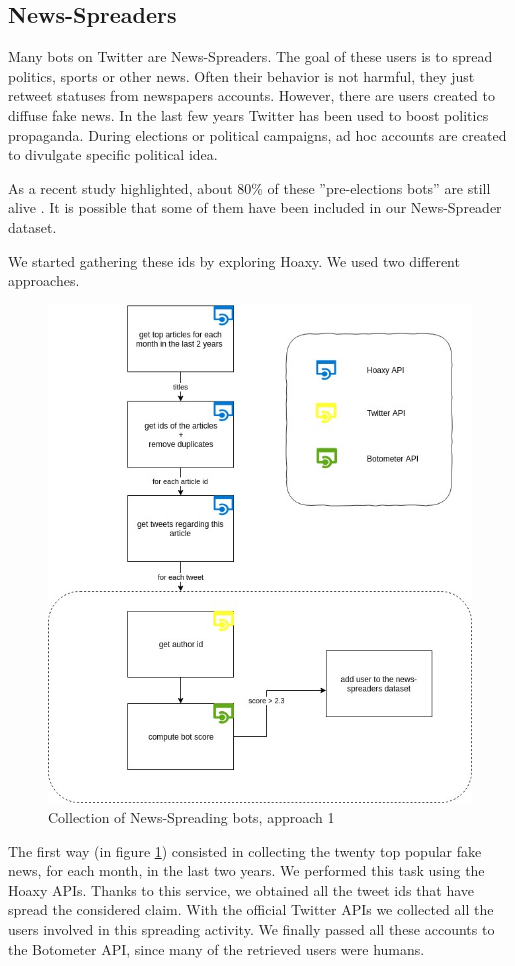 \subsection{News-Spreaders}
Many bots on Twitter are News-Spreaders. The goal of these users is to spread politics, sports or other news. Often their behavior is not harmful, they just retweet statuses from newspapers accounts. However, there are users created to diffuse fake news. In the last few years Twitter has been used to boost politics propaganda. During elections or political campaigns, ad hoc accounts are created to divulgate specific political idea.

As a recent study highlighted, about 80\% of these ''pre-elections bots'' are still alive \cite{Disinformation}. It is possible that some of them have been included in our News-Spreader dataset.

We started gathering these ids by exploring Hoaxy.
We used two different approaches.
\begin{figure}[htp]
	\centering
	\includegraphics[width=\columnwidth]{chapter3/figure/news-spreader.jpg}
	\caption{Collection of News-Spreading bots, approach 1}
	\label{fig:News-Spreaders}
\end{figure}
The first way (in figure \ref{fig:News-Spreaders}) consisted in collecting the twenty top popular fake news, for each month, in the last two years. We performed this task using the Hoaxy APIs. Thanks to this service, we obtained all the tweet ids that have spread the considered claim. With the official Twitter APIs we collected all the users involved in this spreading activity. We finally passed all these accounts to the Botometer API, since many of the retrieved users were humans.

